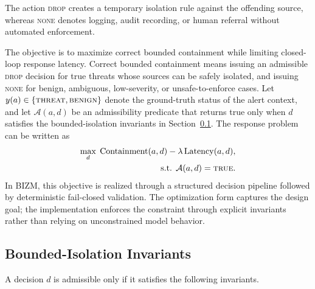 \documentclass[final,5p]{elsarticle}
\begin{document}
The action \textsc{drop} creates a temporary isolation rule against the offending source, whereas \textsc{none} denotes logging, audit recording, or human referral without automated enforcement.

The objective is to maximize correct bounded containment while limiting closed-loop response latency. Correct bounded containment means issuing an admissible \textsc{drop} decision for true threats whose sources can be safely isolated, and issuing \textsc{none} for benign, ambiguous, low-severity, or unsafe-to-enforce cases. Let $y(a)\in\{\textsc{threat},\textsc{benign}\}$ denote the ground-truth status of the alert context, and let $\mathcal{A}(a,d)$ be an admissibility predicate that returns true only when $d$ satisfies the bounded-isolation invariants in Section~\ref{sec:invariants}. The response problem can be written as
\begin{equation}
\begin{aligned}
\max_d \; \mathrm{Containment}(a,d)-\lambda\,\mathrm{Latency}(a,d),
\\
\text{s.t. } \mathcal{A}(a,d)=\textsc{true}.
\end{aligned}
\label{eq:containment}
\end{equation}
In BIZM, this objective is realized through a structured decision pipeline followed by deterministic fail-closed validation. The optimization form captures the design goal; the implementation enforces the constraint through explicit invariants rather than relying on unconstrained model behavior.

\subsection{Bounded-Isolation Invariants}
\label{sec:invariants}

A decision $d$ is admissible only if it satisfies the following invariants.
\end{document}

